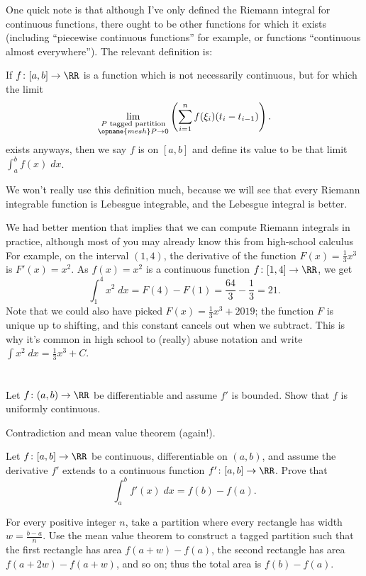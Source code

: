 One quick note is that although I've only defined
the Riemann integral for continuous functions,
there ought to be other functions for which it exists
(including ``piecewise continuous functions'' for example,
or functions ``continuous almost everywhere'').
The relevant definition is:
\begin{definition}
	If $f \colon [a,b] \to \RR$ is a function
	which is not necessarily continuous,
	but for which the limit
	\[ \lim_{\substack{\text{$P$ tagged partition}
			\\ \opname{mesh} P \to 0}}
		\left( \sum_{i=1}^n f(\xi_i) (t_i - t_{i-1}) \right). \]
	exists anyways,
	then we say $f$ is  on $[a,b]$
	and define its value to be that limit $\int_a^b f(x) \; dx$.
\end{definition}
We won't really use this definition much,
because we will see that every Riemann integrable function
is Lebesgue integrable, and the Lebesgue integral is better.

\begin{example}
	We had better mention that 
	implies that we can compute Riemann integrals in practice,
	although most of you may already know this
	from high-school calculus
	For example, on the interval $(1,4)$,
	the derivative of the function $F(x) = \frac13 x^3$ is $F'(x) = x^2$.
	As $f(x) = x^2$ is a continuous function $f \colon [1,4] \to \RR$, we get
	\[ \int_1^4 x^2 \; dx =
		F(4) - F(1) = \frac{64}{3} - \frac13 = 21. \]
	Note that we could also have picked $F(x) = \frac13x^3 + 2019$;
	the function $F$ is unique up to shifting,
	and this constant cancels out when we subtract.
	This is why it's common in high school to (really) abuse notation
	and write $\int x^2 \; dx = \frac13x^3+C$.
\end{example}

\section{\problemhead}
\begin{problem}
	Let $f \colon (a,b) \to \RR$ be differentiable
	and assume $f'$ is bounded.
	Show that $f$ is uniformly continuous.
	\begin{hint}
		Contradiction and mean value theorem (again!).
	\end{hint}
\end{problem}

\begin{sproblem}
	\label{thm:FTC}
	Let $f \colon [a,b] \to \RR$ be continuous,
	differentiable on $(a,b)$,
	and assume the derivative $f'$ extends to a
	continuous function $f' \colon [a,b] \to \RR$.
	Prove that
	\[ \int_a^b f'(x) \; dx = f(b) - f(a). \]
	\begin{hint}
		For every positive integer $n$,
		take a partition where every rectangle has width $w = \frac{b-a}{n}$.
		Use the mean value theorem to construct a tagged partition
		such that the first rectangle has area $f(a+w)-f(a)$,
		the second rectangle has area $f(a+2w) - f(a+w)$, and so on;
		thus the total area is $f(b) - f(a)$.
	\end{hint}
\end{sproblem}


